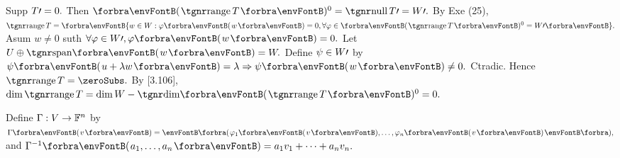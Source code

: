 Supp $T\prime=0.$ Then $\Par{\range T}{^0}=\null T\apostrophe=W\apostrophe.$\parSol{}
By Exe (25), $\range T=\Bra{w\in W:\varphi\Par{w}=0,\forall\varphi\in\Par{\range T}{^0}=W\apostrophe}.$\parSol{}
Asum $w\neq 0$ suth $\forall\varphi\in W\apostrophe,\varphi\Par{w}=0.$ Let $U\oplus\Span{w}=W.$\parSol{}
Define $\psi\in W\prime$ by $\psi\Par{u+\lambda w}=\lambda\Rightarrow\psi\Par{w}\neq 0.$ Ctradic. Hence $\range T=\zeroSubs.$\PfEnd\vspace{2pt}\parSol{}
\Or {} \;By [3.106], $\dim \range T=\dim W-\Dim\Par{\range T}{^0}=0.$\PfEnd
\SepLine

Define $\Gamma:V\rightarrow{\mathbb{F}}^n$ by $\Gamma\Par{v}=\BigPar{\varphi_1\Par{v},\dots,\varphi_{n}\Par{v}},$ and
$\Gamma^{-1}\Par{a_1,\dots,a_n}=a_1v_1+\dots+a_nv_n.$\PfEnd
\SepLine


